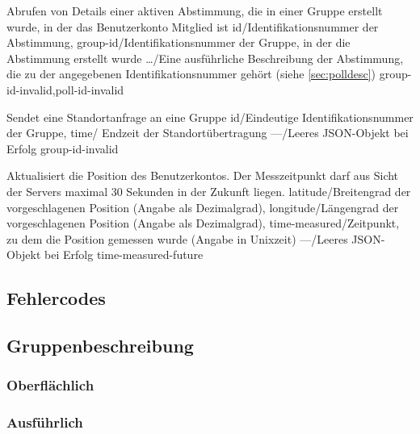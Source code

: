 \documentclass[parskip=full,11pt]{scrartcl}
\begin{document}
{Abrufen von Details einer aktiven Abstimmung, die in einer Gruppe erstellt
wurde, in der das Benutzerkonto Mitglied ist}
{id/Identifikationsnummer der Abstimmung,
group-id/Identifikationsnummer der Gruppe{,} in der die Abstimmung erstellt
wurde}
{\dots/Eine ausführliche Beschreibung der Abstimmung{,} die zu der angegebenen
Identifikationsnummer gehört (siehe \ref{sec:polldesc})}
{group-id-invalid,poll-id-invalid}

{Sendet eine Standortanfrage an eine Gruppe}
{id/Eindeutige Identifikationsnummer der Gruppe,
time/ Endzeit der Standortübertragung}
{---/Leeres JSON-Objekt bei Erfolg}
{group-id-invalid}

{Aktualisiert die Position des Benutzerkontos.
Der Messzeitpunkt darf aus Sicht der Servers maximal 30 Sekunden in der Zukunft
liegen.}
{latitude/Breitengrad der vorgeschlagenen Position (Angabe als Dezimalgrad),
longitude/Längengrad der vorgeschlagenen Position (Angabe als Dezimalgrad),
time-measured/Zeitpunkt{,} zu dem die Position gemessen wurde (Angabe in
Unixzeit)}
{---/Leeres JSON-Objekt bei Erfolg}
{time-measured-future}

\subsection{Fehlercodes}\label{sec:errorcodes}
\apiErrorTable

\subsection{Gruppenbeschreibung}\label{sec:groupdesc}

\subsubsection{Oberflächlich}

\subsubsection{Ausführlich}
\end{document}
